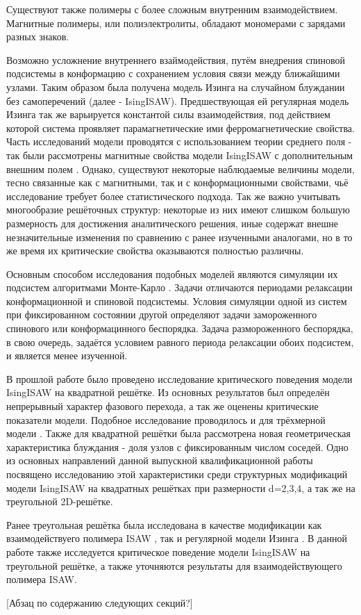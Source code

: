 
Существуют также полимеры с более сложным внутренним взаимодействием.
Магнитные полимеры, или полиэлектролиты, обладают мономерами с зарядами разных знаков.

Возможно усложнение внутреннего взаймодействия, путём внедрения спиновой подсистемы в конформацию 
с сохранением условия связи между ближайшими узлами.
Таким образом была получена модель Изинга на случайном блуждании без самоперечений (далее - IsingISAW).
Предшествующая ей регулярная модель Изинга так же варьируется константой силы взаимодействия, под действием которой система проявляет парамагнетические ими ферромагнетические свойства.
Часть исследований модели проводятся с использованием теории среднего поля - так были рассмотрены магнитные свойства модели IsingISAW с дополнительным внешним полем \cite{Garel1999}. 
Однако, существуют некоторые наблюдаемые величины модели, тесно связанные как с магнитными, так и с конформационными свойствами, чьё исследование требует более статистического подхода.
Так же важно учитывать многообразие решёточных структур: некоторые из них имеют слишком большую размерность для достижения аналитического решения, 
иные содержат внешне незначительные изменения по сравнению с ранее изученными аналогами, 
но в то же время их критические свойства оказываются полностью различны.

Основным способом исследования подобных моделей являются симуляции их подсистем алгоритмами Монте-Карло \cite{Worm, Wolff, madras1988pivot}.
Задачи отличаются периодами релаксации конформационной и спиновой подсистемы.
Условия симуляции одной из систем при фиксированном состоянии другой определяют задачи замороженного спинового или конформацинного беспорядка.
Задача размороженного беспорядка, в свою очередь, задаётся условием равного периода релаксации обоих подсистем, и является менее изученной.

В прошлой работе \cite{faizullina2021critical} было проведено исследование критического поведения модели IsingISAW на квадратной решётке.
Из основных результатов был определён непрерывный характер фазового перехода, а так же оценены критические показатели модели.
Подобное исследование проводилось и для трёхмерной модели \cite{foster2021critical}.
Также для квадратной решётки была рассмотрена новая геометрическая характеристика блуждания - доля узлов с фиксированным числом соседей. 
Одно из основных направлений данной выпускной квалификационной работы посвящено исследованию этой характеристики среди 
структурных модификаций модели IsingISAW на квадратных решётках при размерности d=2,3,4, а так же на треугольной 2D-решётке.

Ранее треугольная решётка была исследована в качестве модификации как взаимодействуего полимера ISAW \cite{Privman1986}, 
так и регулярной модели Изинга \cite{ShchurTriangle, selke2006critical}. 
В данной работе также исследуется критическое поведение модели IsingISAW на треугольной решётке, а также уточняются результаты для взаимодействующего полимера ISAW.

[Абзац по содержанию следующих секций?]
